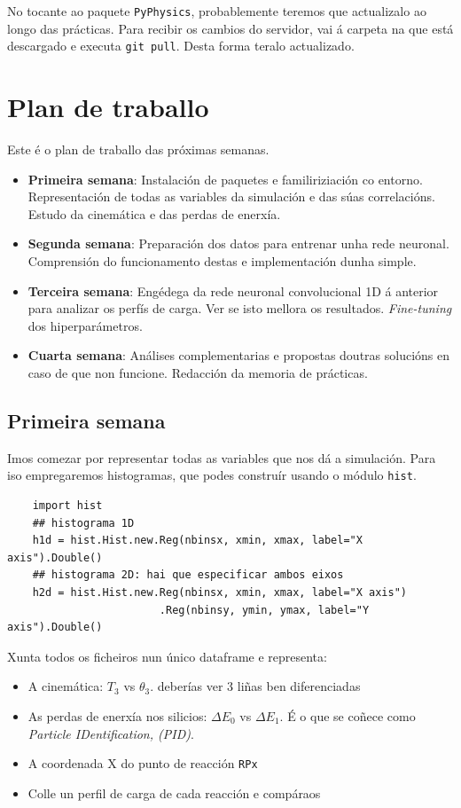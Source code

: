 \documentclass[11pt, a4paper]{article}
\begin{document}
No tocante ao paquete \texttt{PyPhysics}, probablemente teremos que actualizalo ao longo das prácticas. Para recibir os cambios do servidor, vai á carpeta na que está descargado e executa \verb|git pull|. Desta forma teralo actualizado.


\section{Plan de traballo}
Este é o plan de traballo das próximas semanas.

\begin{itemize}
    \item \textbf{Primeira semana}: Instalación de paquetes e familiriziación co entorno. Representación de todas as variables da simulación e das súas correlacións. Estudo da cinemática e das perdas de enerxía.
    \item \textbf{Segunda semana}: Preparación dos datos para entrenar unha rede neuronal. Comprensión do funcionamento destas e implementación dunha simple.
    \item \textbf{Terceira semana}: Engédega da rede neuronal convolucional 1D á anterior para analizar os perfís de carga. Ver se isto mellora os resultados. \textit{Fine-tuning} dos hiperparámetros.
    \item \textbf{Cuarta semana}: Análises complementarias e propostas doutras solucións en caso de que non funcione. Redacción da memoria de prácticas.
\end{itemize}

\subsection{Primeira semana}
Imos comezar por representar todas as variables que nos dá a simulación. Para iso empregaremos histogramas, que podes construír usando o módulo \verb|hist|.

\begin{lstlisting}
    import hist
    ## histograma 1D
    h1d = hist.Hist.new.Reg(nbinsx, xmin, xmax, label="X axis").Double()
    ## histograma 2D: hai que especificar ambos eixos
    h2d = hist.Hist.new.Reg(nbinsx, xmin, xmax, label="X axis")
                        .Reg(nbinsy, ymin, ymax, label="Y axis").Double()

\end{lstlisting}
Xunta todos os ficheiros nun único dataframe e representa:

\begin{itemize}
    \item A cinemática: $T_3$ vs $\theta_3$. deberías ver 3 liñas ben diferenciadas
    \item As perdas de enerxía nos silicios: $\Delta E_0$ vs $\Delta E_1$. É o que se coñece como \textit{Particle IDentification, (PID)}.
    \item A coordenada X do punto de reacción \verb|RPx|
    \item Colle un perfil de carga de cada reacción e compáraos
\end{itemize}
\end{document}
